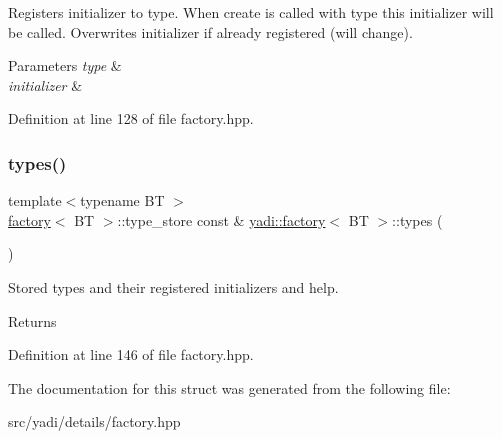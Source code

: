Registers initializer to type. When create is called with type this initializer will be called. Overwrites initializer if already registered (will change). 


\begin{DoxyParams}{Parameters}
{\em type} & \\
\hline
{\em initializer} & \\
\hline
\end{DoxyParams}


Definition at line 128 of file factory.\+hpp.

\mbox{\label{structyadi_1_1factory_aa167d70b963561d24c8a32f680d7e8c0}} 
\subsubsection{\texorpdfstring{types()}{types()}}
{\footnotesize\ttfamily template$<$typename BT $>$ \\
\hyperlink{structyadi_1_1factory}{factory}$<$ BT $>$\+::type\+\_\+store const  \& \hyperlink{structyadi_1_1factory}{yadi\+::factory}$<$ BT $>$\+::types (\begin{DoxyParamCaption}{ }\end{DoxyParamCaption})\hspace{0.3cm}{\ttfamily [static]}}



Stored types and their registered initializers and help. 

\begin{DoxyReturn}{Returns}

\end{DoxyReturn}


Definition at line 146 of file factory.\+hpp.



The documentation for this struct was generated from the following file\+:\begin{DoxyCompactItemize}
\item 
src/yadi/details/factory.\+hpp\end{DoxyCompactItemize}
